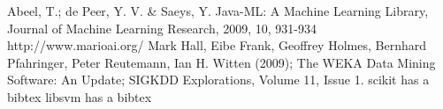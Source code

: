 \documentclass[]{article}   %
\begin{document}
\begin{thebibliography}{9}
  Abeel, T.; de Peer, Y. V. \& Saeys, Y. Java-ML: A Machine Learning Library, Journal of Machine Learning Research, 2009, 10, 931-934
  http://www.marioai.org/
  Mark Hall, Eibe Frank, Geoffrey Holmes, Bernhard Pfahringer, Peter Reutemann, Ian H. Witten (2009); The WEKA Data Mining Software: An Update; SIGKDD Explorations, Volume 11, Issue 1.
  scikit has a bibtex
  libsvm has a bibtex
\end{thebibliography}
\end{document}
